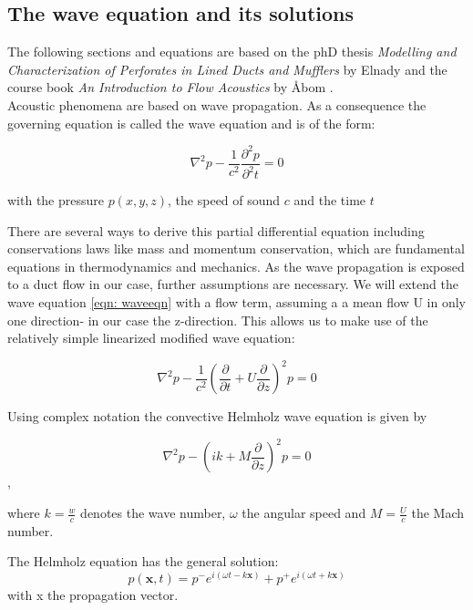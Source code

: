 \documentclass[11pt]{report} %
\begin{document}
\subsection{The wave equation and its solutions}
The following sections and equations are based on the phD thesis \textit{Modelling and Characterization of Perforates in Lined Ducts and Mufflers} by Elnady \cite{Elnady2004} and the course book \textit{An Introduction to Flow Acoustics} by Åbom \cite{Abom2010}.\\ 
Acoustic phenomena are based on wave propagation. As a consequence the governing equation is called the wave equation and is of the form: 

\begin{equation}
    \nabla^2p-\frac{1}{c^2}\frac{\partial^2p}{\partial^2t}  = 0 \label{eqn: waveeqn}
 \end{equation} 
 
with the pressure $p(x,y,z)$, the speed of sound $c$ and the time $t$

There are several ways to derive this partial differential equation including conservations laws like mass and momentum conservation, which are fundamental equations in thermodynamics and mechanics.
As the wave propagation is exposed to a duct flow in our case, further assumptions are necessary.
We will extend the wave equation \eqref{eqn: waveeqn} with a flow term, assuming a a mean flow U in only one direction- in our case the z-direction.
This allows us to make use of the relatively simple linearized modified wave equation: 

\begin{equation}
    \nabla ^2p-\frac{1}{c^2} \left( \frac{\partial}{\partial t}+U\frac{\partial}{\partial z} \right)^2p  = 0
\end{equation}   

Using complex notation the convective Helmholz wave equation is given by 

\begin{equation}
\nabla^2 p - \left(ik +M\frac{\partial}{\partial z}\right)^2p = 0
\end{equation},  

where $k=\frac{w}{c}$ denotes the wave number, $\omega$ the angular speed and $M=\frac{U}{c}$ the Mach number. 

The Helmholz equation has the general solution:
\begin{equation}
p(\textbf{x},t)=p^{-}e^{i(\omega t-k\textbf{x})}+p^{+}e^{i(\omega t+k\textbf{x})}
\end{equation}
with x the propagation vector. 
\end{document}
